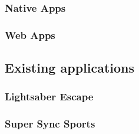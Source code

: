 \subsubsection{Native Apps}

\subsubsection{Web Apps}

\subsection{Existing applications}

\subsubsection{Lightsaber Escape} %

\subsubsection{Super Sync Sports} %



\clearpage
